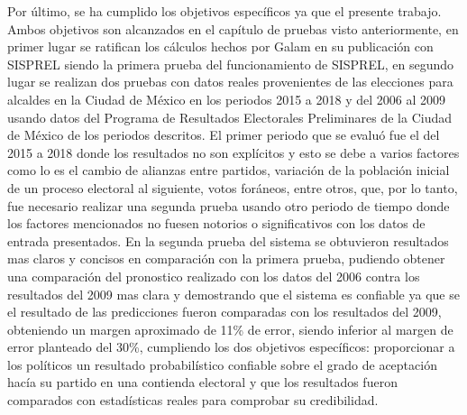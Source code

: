 Por último, se ha cumplido los objetivos específicos ya que el presente trabajo. Ambos objetivos son alcanzados en el capítulo de pruebas visto anteriormente, en primer lugar se ratifican los cálculos hechos por Galam en su publicación \cite{Galam2008} con SISPREL siendo la primera prueba del funcionamiento de SISPREL, en segundo lugar se realizan dos pruebas con datos reales provenientes de las elecciones para alcaldes en la Ciudad de México en los periodos 2015 a 2018 y del 2006 al 2009 usando datos del Programa de Resultados Electorales Preliminares de la Ciudad de México de los periodos descritos. El primer periodo que se evaluó fue el del 2015 a 2018 donde los resultados no son explícitos y esto se debe a varios factores como lo es el cambio de alianzas entre partidos, variación de la población inicial de un proceso electoral al siguiente, votos foráneos, entre otros, que, por lo tanto, fue necesario realizar una segunda prueba usando otro periodo de tiempo donde los factores mencionados no fuesen notorios o significativos con los datos de entrada presentados. En la segunda prueba del sistema se obtuvieron resultados mas claros y concisos en comparación con la primera prueba, pudiendo obtener una comparación del pronostico realizado con los datos del 2006 contra los resultados del 2009 mas clara y demostrando que el sistema es confiable ya que se el resultado de las predicciones fueron comparadas con los resultados del 2009, obteniendo un margen aproximado de 11\% de error, siendo inferior al margen de error planteado del 30\%, cumpliendo los dos objetivos específicos: proporcionar a los políticos un resultado probabilístico confiable sobre el grado de aceptación hacía su partido en una contienda electoral y que los resultados fueron comparados con estadísticas reales para comprobar su credibilidad.


